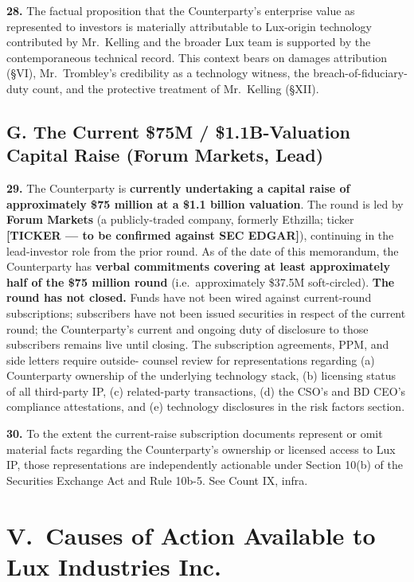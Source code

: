\documentclass[11pt,letterpaper]{article}
\begin{document}
\textbf{28.} The factual proposition that the Counterparty's
enterprise value as represented to investors is materially attributable
to Lux-origin technology contributed by Mr.\ Kelling and the broader
Lux team is supported by the contemporaneous technical record. This
context bears on damages attribution (\S VI), Mr.\ Trombley's
credibility as a technology witness, the breach-of-fiduciary-duty
count, and the protective treatment of Mr.\ Kelling (\S XII).

\subsection*{G. The Current \$75M / \$1.1B-Valuation Capital Raise (Forum Markets, Lead)}

\textbf{29.} The Counterparty is \textbf{currently undertaking a
capital raise of approximately \$75 million at a \$1.1 billion
valuation}. The round is led by \textbf{Forum Markets} (a
publicly-traded company, formerly Ethzilla; ticker \textbf{[TICKER ---
to be confirmed against SEC EDGAR]}), continuing in the lead-investor
role from the prior round. As of the date of this memorandum, the
Counterparty has \textbf{verbal commitments covering at least
approximately half of the \$75 million round} (i.e.\ approximately
\$37.5M soft-circled). \textbf{The round has not closed.} Funds have
not been wired against current-round subscriptions; subscribers have
not been issued securities in respect of the current round; the
Counterparty's current and ongoing duty of disclosure to those
subscribers remains live until closing.
The subscription agreements, PPM, and side letters require outside-
counsel review for representations regarding (a) Counterparty
ownership of the underlying technology stack, (b) licensing status of
all third-party IP, (c) related-party transactions, (d) the CSO's
and BD CEO's compliance attestations, and (e) technology disclosures
in the risk factors section.

\textbf{30.} To the extent the current-raise subscription documents represent or omit
material facts regarding the Counterparty's ownership or licensed
access to Lux IP, those representations are independently actionable
under Section 10(b) of the Securities Exchange Act and Rule 10b-5.
See Count IX, infra.

\section*{V.\ Causes of Action Available to Lux Industries Inc.}
\end{document}
